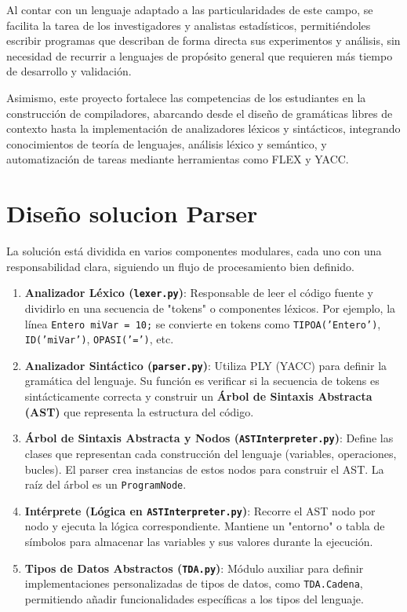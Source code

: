 \documentclass{article}
\begin{document}
Al contar con un lenguaje adaptado a las particularidades de este campo, se facilita la tarea de los investigadores y analistas estadísticos, permitiéndoles escribir programas que describan de forma directa sus experimentos y análisis, sin necesidad de recurrir a lenguajes de propósito general que requieren más tiempo de desarrollo y validación.

Asimismo, este proyecto fortalece las competencias de los estudiantes en la construcción de compiladores, abarcando desde el diseño de gramáticas libres de contexto hasta la implementación de analizadores léxicos y sintácticos, integrando conocimientos de teoría de lenguajes, análisis léxico y semántico, y automatización de tareas mediante herramientas como FLEX y YACC.

\section{Diseño solucion Parser}

La solución está dividida en varios componentes modulares, cada uno con una responsabilidad clara, siguiendo un flujo de procesamiento bien definido.

\begin{enumerate}
    \item \textbf{Analizador Léxico (\texttt{lexer.py})}: Responsable de leer el código fuente y dividirlo en una secuencia de "tokens" o componentes léxicos. Por ejemplo, la línea \texttt{Entero miVar = 10;} se convierte en tokens como \texttt{TIPOA('Entero')}, \texttt{ID('miVar')}, \texttt{OPASI('=')}, etc.

    \item \textbf{Analizador Sintáctico (\texttt{parser.py})}: Utiliza PLY (YACC) para definir la gramática del lenguaje. Su función es verificar si la secuencia de tokens es sintácticamente correcta y construir un \textbf{Árbol de Sintaxis Abstracta (AST)} que representa la estructura del código.

    \item \textbf{Árbol de Sintaxis Abstracta y Nodos (\texttt{ASTInterpreter.py})}: Define las clases que representan cada construcción del lenguaje (variables, operaciones, bucles). El parser crea instancias de estos nodos para construir el AST. La raíz del árbol es un \texttt{ProgramNode}.

    \item \textbf{Intérprete (Lógica en \texttt{ASTInterpreter.py})}: Recorre el AST nodo por nodo y ejecuta la lógica correspondiente. Mantiene un "entorno" o tabla de símbolos para almacenar las variables y sus valores durante la ejecución.

    \item \textbf{Tipos de Datos Abstractos (\texttt{TDA.py})}: Módulo auxiliar para definir implementaciones personalizadas de tipos de datos, como \texttt{TDA.Cadena}, permitiendo añadir funcionalidades específicas a los tipos del lenguaje.
\end{enumerate}
\end{document}
